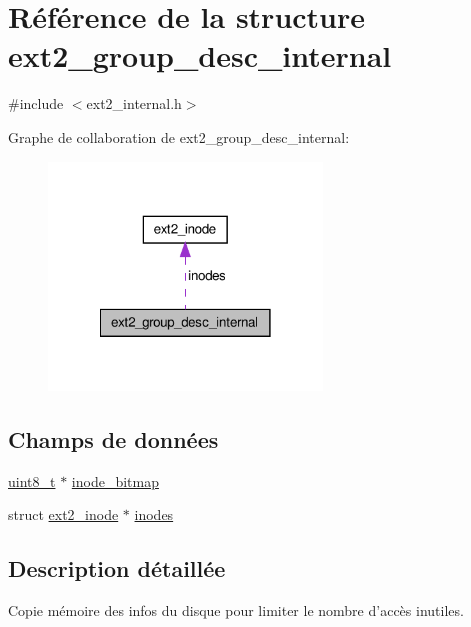 \hypertarget{structext2__group__desc__internal}{\section{Référence de la structure ext2\-\_\-group\-\_\-desc\-\_\-internal}
\label{structext2__group__desc__internal}
}


{\ttfamily \#include $<$ext2\-\_\-internal.\-h$>$}



Graphe de collaboration de ext2\-\_\-group\-\_\-desc\-\_\-internal\-:\nopagebreak
\begin{figure}[H]
\begin{center}
\leavevmode
\includegraphics[width=206pt]{structext2__group__desc__internal__coll__graph}
\end{center}
\end{figure}
\subsection*{Champs de données}
\begin{DoxyCompactItemize}
\item 
\hyperlink{kernel_2include_2types_8h_aba7bc1797add20fe3efdf37ced1182c5}{uint8\-\_\-t} $\ast$ \hyperlink{structext2__group__desc__internal_a5b3cee6954ef4ed21c238b46d389b9bf}{inode\-\_\-bitmap}
\item 
struct \hyperlink{structext2__inode}{ext2\-\_\-inode} $\ast$ \hyperlink{structext2__group__desc__internal_a690f836bfb2c8de04ae2b1753134f8a7}{inodes}
\end{DoxyCompactItemize}


\subsection{Description détaillée}
Copie mémoire des infos du disque pour limiter le nombre d'accès inutiles. 

